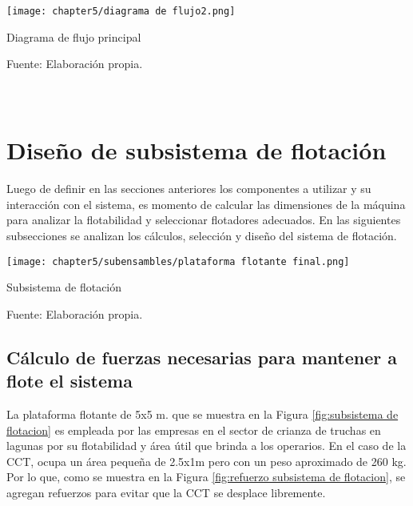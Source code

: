 \begin{myfigure}[H]
	\footnotesize\centering
	\texttt{[image: chapter5/diagrama de flujo2.png]}
	\caption{Diagrama de flujo principal}
	\begin{myflushcenter}
		Fuente: Elaboración propia.
	\end{myflushcenter}
	\label{fig:diagrama de flujo2}
\end{myfigure}

\pagestyle{myportland}
\doublespacing
\chapter[\quad\quad\quad\quad ----- Diseño de subsistema de flotación]{\\ Diseño de subsistema de flotación}
\thispagestyle{myportland}
\label{ssec:diseno de subsistema de flotacion}

Luego de definir en las secciones anteriores los componentes a utilizar y su interacción con el sistema, es momento de calcular las dimensiones de la máquina para analizar la flotabilidad y seleccionar flotadores adecuados. En las siguientes subsecciones se analizan los cálculos, selección y diseño del sistema de flotación.

\begin{myfigure}[H]
	\footnotesize\centering
	\texttt{[image: chapter5/subensambles/plataforma flotante final.png]}
	\caption{Subsistema de flotación}
	\begin{myflushcenter}
		Fuente: Elaboración propia.
	\end{myflushcenter}
	\label{fig:subsistema de flotacion}
\end{myfigure}

\section{Cálculo de fuerzas necesarias para mantener a flote el sistema}

La plataforma flotante de 5x5 m. que se muestra en la Figura \ref{fig:subsistema de flotacion} es empleada por las empresas en el sector de crianza de truchas en lagunas por su flotabilidad y área útil que brinda a los operarios. En el caso de la CCT, ocupa un área pequeña de 2.5x1m pero con un peso aproximado de 260 kg. Por lo que, como se muestra en la Figura \ref{fig:refuerzo subsistema de flotacion}, se agregan refuerzos para evitar que la CCT se desplace libremente.

